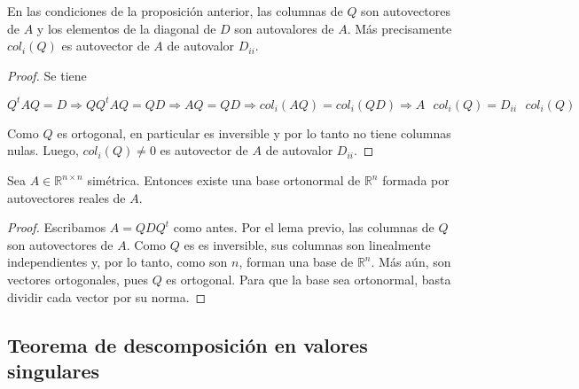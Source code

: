 \begin{lema}
En las condiciones de la proposición anterior, las columnas de $Q$ son autovectores de $A$ y los elementos de la diagonal de $D$ son autovalores de $A$. Más precisamente $col_i(Q)$ es autovector de $A$ de autovalor $D_{ii}$.

\begin{proof}
Se tiene

\[Q^tAQ = D \Rightarrow QQ^t AQ = QD \Rightarrow AQ = QD \Rightarrow col_i(AQ) = col_i(QD) \Rightarrow A\text{ }col_i(Q) = D_{ii}\text{ }col_i(Q)\]

Como $Q$ es ortogonal, en particular es inversible y por lo tanto no tiene columnas nulas. Luego, $col_i(Q) \neq 0$ es autovector de $A$ de autovalor $D_{ii}$.
\end{proof}
\end{lema}

\begin{teo}
\label{teo:diagonalizacion}
Sea $A \in \mathbb{R}^{n \times n}$ simétrica. Entonces existe una base ortonormal de $\mathbb{R}^n$ formada por autovectores reales de $A$.

\begin{proof}
Escribamos $A = QDQ^t$ como antes. Por el lema previo, las columnas de $Q$ son autovectores de $A$. Como $Q$ es es inversible, sus columnas son linealmente independientes y, por lo tanto, como son $n$, forman una base de $\mathbb{R}^n$. Más aún, son vectores ortogonales, pues $Q$ es ortogonal. Para que la base sea ortonormal, basta dividir cada vector por su norma.
\end{proof}
\end{teo}

\subsection{Teorema de descomposición en valores singulares}


